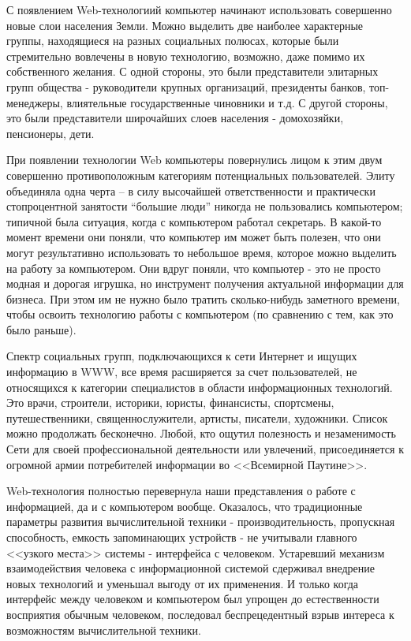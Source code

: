 С появлением Web-технологиий компьютер начинают использовать совершенно новые слои населения Земли. Можно выделить две наиболее характерные группы, находящиеся на разных социальных полюсах, которые были стремительно вовлечены в новую технологию, возможно, даже помимо их собственного желания. С одной стороны, это были представители элитарных групп общества - руководители крупных организаций, президенты банков, топ- менеджеры, влиятельные государственные чиновники и т.д. С другой стороны, это были представители широчайших слоев населения - домохозяйки, пенсионеры, дети.

При появлении технологии Web компьютеры повернулись лицом к этим двум совершенно противоположным категориям потенциальных пользователей. Элиту объединяла одна черта – в силу высочайшей ответственности и практически стопроцентной занятости “большие люди” никогда не пользовались компьютером; типичной была ситуация, когда с компьютером работал секретарь. В какой-то момент времени они поняли, что компьютер им может быть полезен, что они могут результативно использовать то небольшое время, которое можно выделить на работу за компьютером. Они вдруг поняли, что компьютер - это не просто модная и дорогая игрушка, но инструмент получения актуальной информации для бизнеса. При этом им не нужно было тратить сколько-нибудь заметного времени, чтобы освоить технологию работы с компьютером (по сравнению с тем, как это было раньше).

Спектр социальных групп, подключающихся к сети Интернет и ищущих информацию в WWW, все время расширяется за счет пользователей, не относящихся к категории специалистов в области информационных технологий. Это врачи, строители, историки, юристы, финансисты, спортсмены, путешественники, священнослужители, артисты, писатели, художники. Список можно продолжать бесконечно. Любой, кто ощутил полезность и незаменимость Сети для своей профессиональной деятельности или увлечений, присоединяется к огромной армии потребителей информации во <<Всемирной Паутине>>.

Web-технология полностью перевернула наши представления о работе с информацией, да и с компьютером вообще. Оказалось, что традиционные параметры развития вычислительной техники - производительность, пропускная способность, емкость запоминающих устройств - не учитывали главного <<узкого места>> системы - интерфейса с человеком. Устаревший механизм взаимодействия человека с информационной системой сдерживал внедрение новых технологий и уменьшал выгоду от их применения. И только когда интерфейс между человеком и компьютером был упрощен до естественности восприятия обычным человеком, последовал беспрецедентный взрыв интереса к возможностям вычислительной техники.

